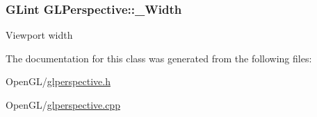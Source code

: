 \label{d1/d8f/classGLPerspective_a69c80f817c645be3adc602e0adaf036c}
\hypertarget{classGLPerspective_a53d38f9b18e35f1d669c72e5c00a8f85}{
\subsubsection[{\-\_\-\-Width}]{\setlength{\rightskip}{0pt plus 5cm}\-G\-Lint {\bf \-G\-L\-Perspective\-::\-\_\-\-Width}}}
\label{d1/d8f/classGLPerspective_a53d38f9b18e35f1d669c72e5c00a8f85}
\-Viewport width 

\-The documentation for this class was generated from the following files\-:\begin{DoxyCompactItemize}
\item 
\-Open\-G\-L/\hyperlink{glperspective_8h}{glperspective.\-h}\item 
\-Open\-G\-L/\hyperlink{glperspective_8cpp}{glperspective.\-cpp}\end{DoxyCompactItemize}
